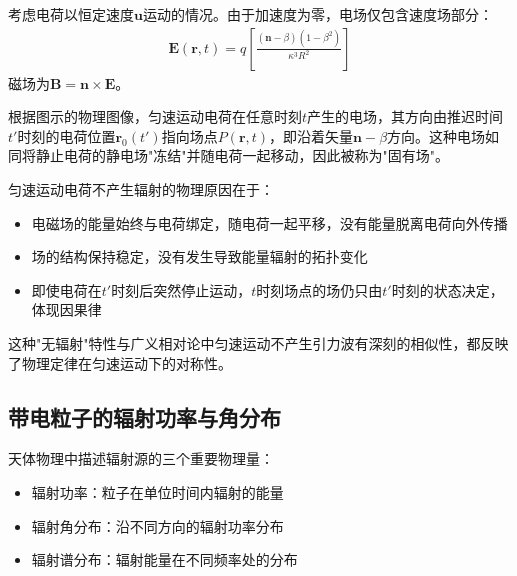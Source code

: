 \begin{example}[匀速运动电荷的电磁场与无辐射特性]
考虑电荷以恒定速度$\mathbf{u}$运动的情况。由于加速度为零，电场仅包含速度场部分：
\begin{align}
\mathbf{E}(\mathbf{r}, t) = q\left[\frac{(\mathbf{n}-\beta)(1-\beta^{2})}{\kappa^{3}R^{2}}\right]
\end{align}
磁场为$\mathbf{B} = \mathbf{n} \times \mathbf{E}$。


根据图示的物理图像，匀速运动电荷在任意时刻$t$产生的电场，其方向由推迟时间$t'$时刻的电荷位置$\mathbf{r}_0(t')$指向场点$P(\mathbf{r},t)$，即沿着矢量$\mathbf{n}-\beta$方向。这种电场如同将静止电荷的静电场"冻结"并随电荷一起移动，因此被称为"固有场"。


匀速运动电荷不产生辐射的物理原因在于：
\begin{itemize}
\item 电磁场的能量始终与电荷绑定，随电荷一起平移，没有能量脱离电荷向外传播
\item 场的结构保持稳定，没有发生导致能量辐射的拓扑变化
\item 即使电荷在$t'$时刻后突然停止运动，$t$时刻场点的场仍只由$t'$时刻的状态决定，体现因果律
\end{itemize}


这种"无辐射"特性与广义相对论中匀速运动不产生引力波有深刻的相似性，都反映了物理定律在匀速运动下的对称性。
\end{example}


\subsection{带电粒子的辐射功率与角分布}

\begin{definition}[辐射的基本描述量]
天体物理中描述辐射源的三个重要物理量：
\begin{itemize}
\item 辐射功率：粒子在单位时间内辐射的能量
\item 辐射角分布：沿不同方向的辐射功率分布
\item 辐射谱分布：辐射能量在不同频率处的分布
\end{itemize}
\end{definition}

